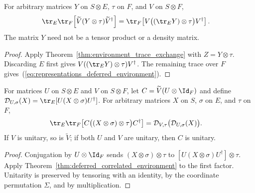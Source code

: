 \begin{theorem}
    \label{thm:deferred_correlated_environment}
    \leanok
    For arbitrary matrices $Y$ on $S\otimes E$, $\tau$ on $F$, and $V$
    on $S\otimes F$,
    \begin{align}
        \tr_E\tr_F\!\left[\widetilde V(Y\otimes\tau)\widetilde V^\dagger\right]
         & =\tr_F\!\left[V\bigl((\tr_EY)\otimes\tau\bigr)V^\dagger\right].
        \label{eq:representations_deferred_environment}
    \end{align}
    The matrix $Y$ need not be a tensor product or a density matrix.
\end{theorem}
\begin{proof}\leanok
    Apply Theorem~\ref{thm:environment_trace_exchange} with $Z=Y\otimes\tau$.
    Discarding $E$ first gives $V((\tr_EY)\otimes\tau)V^\dagger$.
    The remaining trace over $F$ gives~(\ref{eq:representations_deferred_environment}).
\end{proof}

\begin{theorem}
    \label{thm:deferred_environment_composition}
    \leanok
    For matrices $U$ on $S\otimes E$ and $V$ on $S\otimes F$, let
    $C=\widetilde V(U\otimes\Id_F)$ and define
    $\mathcal D_{U,\sigma}(X)=\tr_E[U(X\otimes\sigma)U^\dagger]$.
    For arbitrary matrices $X$ on $S$, $\sigma$ on $E$, and $\tau$ on $F$,
    \begin{align}
        \tr_E\tr_F\!\left[C\bigl((X\otimes\sigma)\otimes\tau\bigr)C^\dagger\right]
         & =\mathcal D_{V,\tau}\bigl(\mathcal D_{U,\sigma}(X)\bigr).
        \label{eq:representations_deferred_composition}
    \end{align}
    If $V$ is unitary, so is $\widetilde V$; if both $U$ and $V$ are
    unitary, then $C$ is unitary.
\end{theorem}
\begin{proof}\leanok
    Conjugation by $U\otimes\Id_F$ sends
    $(X\otimes\sigma)\otimes\tau$ to
    $[U(X\otimes\sigma)U^\dagger]\otimes\tau$.
    Apply Theorem~\ref{thm:deferred_correlated_environment} to the first
    factor. Unitarity is preserved by tensoring with an identity, by the
    coordinate permutation $\Sigma$, and by multiplication.
\end{proof}

